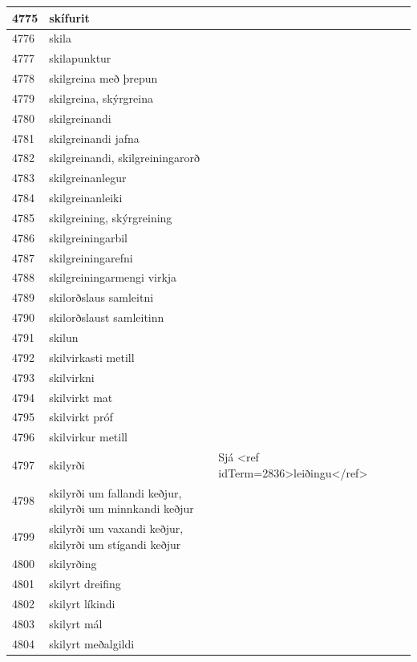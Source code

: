 \begin{longtable}{p{}|p{}|p{}|p{}|p{}}
\hline
4775 & skífurit &  &  &  \\
\hline
4776 & skila &  &  &  \\
\hline
4777 & skilapunktur &  &  &  \\
\hline
4778 & skilgreina með þrepun &  &  &  \\
\hline
4779 & skilgreina, skýrgreina &  &  &  \\
\hline
4780 & skilgreinandi &  &  &  \\
\hline
4781 & skilgreinandi jafna &  &  &  \\
\hline
4782 & skilgreinandi, skilgreiningarorð &  &  &  \\
\hline
4783 & skilgreinanlegur &  &  &  \\
\hline
4784 & skilgreinanleiki &  &  &  \\
\hline
4785 & skilgreining, skýrgreining &  &  &  \\
\hline
4786 & skilgreiningarbil &  &  &  \\
\hline
4787 & skilgreiningarefni &  &  &  \\
\hline
4788 & skilgreiningarmengi virkja &  &  &  \\
\hline
4789 & skilorðslaus samleitni &  &  &  \\
\hline
4790 & skilorðslaust samleitinn &  &  &  \\
\hline
4791 & skilun &  &  &  \\
\hline
4792 & skilvirkasti metill &  &  &  \\
\hline
4793 & skilvirkni &  &  &  \\
\hline
4794 & skilvirkt mat &  &  &  \\
\hline
4795 & skilvirkt próf &  &  &  \\
\hline
4796 & skilvirkur metill &  &  &  \\
\hline
4797 & skilyrði & Sjá <ref idTerm=2836>leiðingu</ref> &  &  \\
\hline
4798 & skilyrði um fallandi keðjur, skilyrði um minnkandi keðjur &  &  &  \\
\hline
4799 & skilyrði um vaxandi keðjur, skilyrði um stígandi keðjur &  &  &  \\
\hline
4800 & skilyrðing &  &  &  \\
\hline
4801 & skilyrt dreifing &  &  &  \\
\hline
4802 & skilyrt líkindi &  &  &  \\
\hline
4803 & skilyrt mál &  &  &  \\
\hline
4804 & skilyrt meðalgildi &  &  &  \\

\end{longtable}
